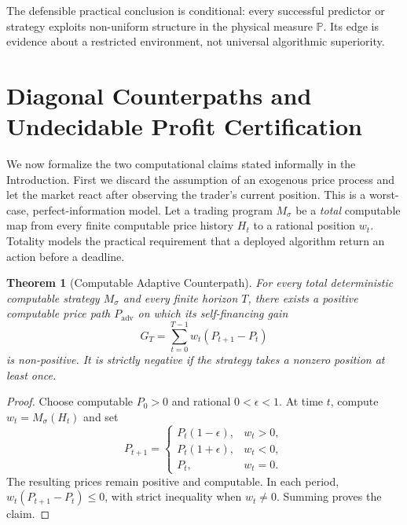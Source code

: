\documentclass[aps,pra,reprint,superscriptaddress,amsmath,amssymb,floatfix]{revtex4-2}
\theoremstyle{plain}
\newtheorem{theorem}{Theorem}
\theoremstyle{definition}
\theoremstyle{remark}
\begin{document}
The defensible practical conclusion is conditional: every successful
predictor or strategy exploits non-uniform structure in the physical measure
\(\mathbb{P}\). Its edge is evidence about a restricted environment, not
universal algorithmic superiority.

\section{Diagonal Counterpaths and Undecidable Profit Certification}
\label{sec:computability}

We now formalize the two computational claims stated informally in the
Introduction. First we discard the assumption of an exogenous price process
and let the market react after observing the trader's current position. This
is a worst-case, perfect-information model. Let a trading program
\(M_\sigma\) be a \emph{total} computable map from every finite computable
price history \(H_t\) to a rational position \(w_t\). Totality models the
practical requirement that a deployed algorithm return an action before a
deadline.

\begin{theorem}[Computable Adaptive Counterpath]
  \label{thm:counterpath}
  For every total deterministic computable strategy \(M_\sigma\) and every
  finite horizon \(T\), there exists a positive computable price path
  \(P_{\mathrm{adv}}\) on which its self-financing gain
  \[
    G_T=\sum_{t=0}^{T-1}w_t(P_{t+1}-P_t)
  \]
  is non-positive. It is strictly negative if the strategy takes a nonzero
  position at least once.
\end{theorem}

\begin{proof}
Choose computable \(P_0>0\) and rational \(0<\epsilon<1\). At time \(t\),
compute \(w_t=M_\sigma(H_t)\) and set
\begin{equation}
P_{t+1}=
\begin{cases}
P_t(1-\epsilon),&w_t>0,\\
P_t(1+\epsilon),&w_t<0,\\
P_t,&w_t=0.
\end{cases}
\label{eq:adversary}
\end{equation}
The resulting prices remain positive and computable. In each period,
\(w_t(P_{t+1}-P_t)\leq0\), with strict inequality when \(w_t\neq0\).
Summing proves the claim.
\end{proof}
\end{document}
